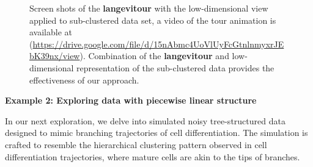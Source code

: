 \documentclass[
  12pt]{article}
\begin{document}
\begin{figure}
\begin{minipage}[t]{0.33\linewidth}
{{}

}

\subcaption{\label{fig-exp1_sc2}}
\end{minipage}%
%
\begin{minipage}[t]{0.33\linewidth}

{\centering 


}

\subcaption{\label{fig-exp1_sc3}}
\end{minipage}%

\caption{\label{fig-exp1_sc}Screen shots of the \textbf{langevitour}
with the low-dimensional view applied to sub-clustered data set, a video
of the tour animation is available at
(\url{https://drive.google.com/file/d/15nAbmc4UoVlUyFcGtnlnmyxrJEbK39nx/view}).
Combination of the \textbf{langevitour} and low-dimensional
representation of the sub-clustered data provides the effectiveness of
our approach.}

\end{figure}

\textbf{Example 2: Exploring data with piecewise linear structure}

In our next exploration, we delve into simulated noisy tree-structured
data designed to mimic branching trajectories of cell differentiation.
The simulation is crafted to resemble the hierarchical clustering
pattern observed in cell differentiation trajectories, where mature
cells are akin to the tips of branches.
\end{document}
